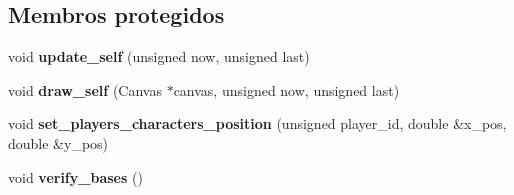 \subsection*{Membros protegidos}
\begin{DoxyCompactItemize}
\item 
\mbox{\label{classMainLevel_a4978a0e152f6a7b55bed0bad74dc7d5a}} 
void {\bfseries update\+\_\+self} (unsigned now, unsigned last)
\item 
\mbox{\label{classMainLevel_aabad926cf0366de353d716065ab792ad}} 
void {\bfseries draw\+\_\+self} (Canvas $\ast$canvas, unsigned now, unsigned last)
\item 
\mbox{\label{classMainLevel_a8b5a146b3b3186081ca2a0ad49bbad29}} 
void {\bfseries set\+\_\+players\+\_\+characters\+\_\+position} (unsigned player\+\_\+id, double \&x\+\_\+pos, double \&y\+\_\+pos)
\item 
\mbox{\label{classMainLevel_a89ed36254771a662797d0ec50105015f}} 
void {\bfseries verify\+\_\+bases} ()
\end{DoxyCompactItemize}
